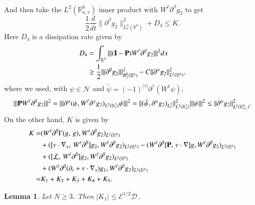 \documentclass{amsart}[12pt, article]
\newtheorem{lemm}[theo]{Lemma}
\begin{document}
 And then take the $L^2({{{\mathbb R}}}^6_{x, v})$ inner product with $W^\ell{{\partial}}^\beta g_2$ to
 get
\begin{equation*}\label{energy1+}
\frac 12 \frac{d}{dt}\|{{\partial}}^\beta g_2\|^2_{L^2_\ell({{{\mathbb R}}}^6)}+D_4\le K.
\end{equation*}
Here $D_4$ is a dissipation rate given by
\begin{align*}
 D_4&=\int_{{{{\mathbb R}}}^3}||| ({{\bf I}}-{{\bf P}})W^\ell{{\partial}}^\beta g_2 |||^2dx
\\&\ge \frac 12||| {{\partial}}^\beta g_2 |||^2_{{{\mathcal B}}^{0}_\ell({{{\mathbb R}}}^6)}-
C|| {{\partial}}^\alpha g_2 ||^2_{L^2({{{\mathbb R}}}^6)}.
\end{align*}
where we used, with $\psi\in \mathcal{N}$ and
$\tilde{\psi}=(-1)^{|\gamma|}{{\partial}}^\gamma(W^\ell\psi)$,
\[
|||{{\bf P}} W^\ell{{\partial}}^\beta g_2|||^2 =|||{{\partial}}^\alpha (\psi, W^\ell{{\partial}}^\gamma g_2)_{L^2({{{\mathbb R}}}^3_v)}\psi|||^2
=\|(\tilde{\psi},{{\partial}}^\alpha g_2)_{L^2_{v}}\|_{L^2({{{\mathbb R}}}^3_x)}^2|||\psi|||^2
\le ||{{\partial}}^\alpha g_2||_{L^2({{{\mathbb R}}}^6_{x, v})}^2.
\]
On the other hand, $K$ is given by
\begin{align*}
K=& (W^\ell{{\partial}}^\beta \Gamma(g,\,g), W^\ell{{\partial}}^\beta g_2)_{L^2({{{\mathbb R}}}^6)}
\\&+
([v\cdot\nabla_x,\, W^\ell{{\partial}}^\beta]g_2, W^\ell{{\partial}}^\beta g_2)_{L^2({{{\mathbb R}}}^6)}
- (W^\ell {{\partial}}^\beta [{{\bf P}},\, v\cdot \nabla]g, W^\ell{{\partial}}^\beta g_2)_{L^2({{{\mathbb R}}}^6)}
\\&+
([\mathcal{L},\, W^\ell{{\partial}}^\beta]g_2, W^\ell{{\partial}}^\beta g_2)_{L^2{({{{\mathbb R}}}^6)}}
\\&+
(W^\ell{{\partial}}^\beta ({{\partial}}_t+v\cdot\nabla_x )g_1, W^\ell{{\partial}}^\beta g_2)_{L^2({{{\mathbb R}}}^6)}
\\=&
K_1+K_2+K_3+K_4+ K_5.
\end{align*}
\begin{lemm}\label{K1}
Let $N\ge 3$. Then $
|K_1|\le  \mathcal{E}^{1/2} \mathcal{D}\,.
$
\end{lemm}
\end{document}
